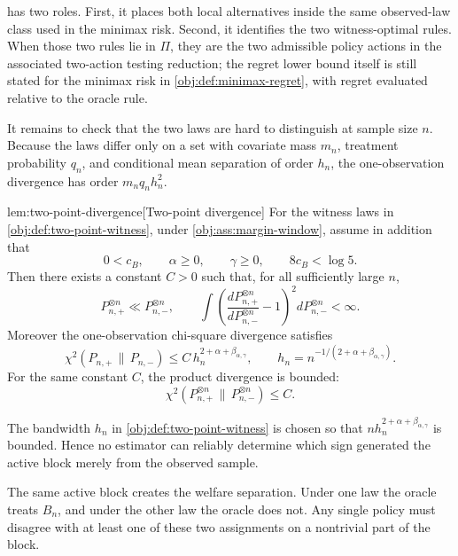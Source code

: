  has two roles.  First, it places both local alternatives inside the same observed-law class used in the minimax risk.  Second, it identifies the two witness-optimal rules.  When those two rules lie in \(\Pi\), they are the two admissible policy actions in the associated two-action testing reduction; the regret lower bound itself is still stated for the minimax risk in \cref{obj:def:minimax-regret}, with regret evaluated relative to the oracle rule.

It remains to check that the two laws are hard to distinguish at sample size \(n\).  Because the laws differ only on a set with covariate mass \(m_n\), treatment probability \(q_n\), and conditional mean separation of order \(h_n\), the one-observation divergence has order \(m_nq_nh_n^2\).

\begin{lemmav}{lem:two-point-divergence}[Two-point divergence]
For the witness laws in \cref{obj:def:two-point-witness}, under \cref{obj:ass:margin-window}, assume in addition that
\[
0<c_B,\qquad \alpha\ge 0,\qquad \gamma\ge 0,
\qquad 8c_B<\log 5.
\]
Then there exists a constant \(C>0\) such that, for all sufficiently large \(n\),
\[
P_{n,+}^{\otimes n}\ll P_{n,-}^{\otimes n},
\qquad
\int \left(\frac{dP_{n,+}^{\otimes n}}{dP_{n,-}^{\otimes n}}-1\right)^2
  dP_{n,-}^{\otimes n}<\infty.
\]
Moreover the one-observation chi-square divergence satisfies
\[
\chi^2(P_{n,+}\,\|\,P_{n,-})
 \le C\,h_n^{2+\alpha+\beta_{\alpha,\gamma}},
\qquad
h_n=n^{-1/(2+\alpha+\beta_{\alpha,\gamma})}.
\]
For the same constant \(C\), the product divergence is bounded:
\[
\chi^2(P_{n,+}^{\otimes n}\,\|\,P_{n,-}^{\otimes n})\le C.
\]
\end{lemmav}

The bandwidth \(h_n\) in \cref{obj:def:two-point-witness} is chosen so that \(n h_n^{2+\alpha+\beta_{\alpha,\gamma}}\) is bounded.  Hence no estimator can reliably determine which sign generated the active block merely from the observed sample.

The same active block creates the welfare separation.  Under one law the oracle treats \(B_n\), and under the other law the oracle does not.  Any single policy must disagree with at least one of these two assignments on a nontrivial part of the block.

